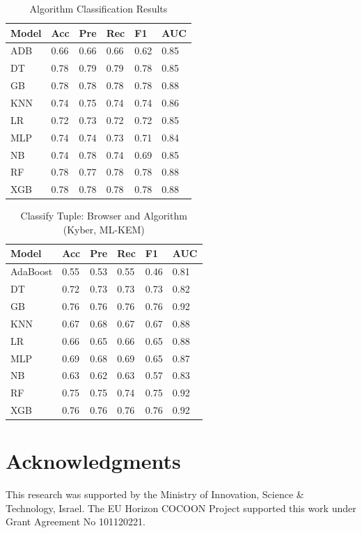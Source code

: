 \documentclass[10pt,journal]{IEEEtran}%
\begin{document}
\begin{table}
\centering
\caption{Algorithm Classification Results}
\vspace{1.5mm}
\label{tab:algorithms}
\begin{tabular}{|l|l|l|l|l|l|}
\hline
Model               & Acc & Pre & Rec & F1 & AUC  \\ \hline\hline
ADB            & 0.66     & 0.66      & 0.66   & 0.62     & 0.85 \\ \hline
DT       & 0.78     & 0.79      & 0.79   & 0.78     & 0.85 \\ \hline
GB   & 0.78     & 0.78      & 0.78   & 0.78     & 0.88 \\ \hline
KNN                 & 0.74     & 0.75      & 0.74   & 0.74     & 0.86 \\ \hline
LR & 0.72     & 0.73      & 0.72   & 0.72     & 0.85 \\ \hline
MLP                 & 0.74     & 0.74      & 0.73   & 0.71     & 0.84 \\ \hline
NB         & 0.74     & 0.78      & 0.74   & 0.69     & 0.85 \\ \hline
RF       & 0.78     & 0.77      & 0.78   & 0.78     & 0.88 \\ \hline
XGB             & 0.78     & 0.78      & 0.78   & 0.78     & 0.88 \\ \hline
\end{tabular}
\end{table}



\begin{table}[!]
\centering
\caption{Classify Tuple: Browser and Algorithm (Kyber, ML-KEM)}
\vspace{1.5mm}
\label{tab:tuple}
\begin{tabular}{|l|l|l|l|l|l|}
\hline
Model               & Acc & Pre & Rec & F1 & AUC  \\ \hline \hline
AdaBoost            & 0.55     & 0.53      & 0.55   & 0.46     & 0.81 \\ \hline
DT       & 0.72     & 0.73      & 0.73   & 0.73     & 0.82 \\ \hline
GB   & 0.76     & 0.76      & 0.76   & 0.76     & 0.92 \\ \hline
KNN                 & 0.67     & 0.68      & 0.67   & 0.67     & 0.88 \\ \hline
LR & 0.66     & 0.65      & 0.66   & 0.65     & 0.88 \\ \hline
MLP                 & 0.69     & 0.68      & 0.69   & 0.65     & 0.87 \\ \hline
NB         & 0.63     & 0.62      & 0.63   & 0.57     & 0.83 \\ \hline
RF      & 0.75     & 0.75      & 0.74   & 0.75     & 0.92 \\ \hline
XGB             & 0.76     & 0.76      & 0.76   & 0.76     & 0.92 \\ \hline
\end{tabular}
\end{table}


\section{Acknowledgments}
This research was supported by the Ministry of Innovation, Science \& Technology, Israel. The EU Horizon COCOON Project supported this work under Grant Agreement No 101120221.



\end{document}
